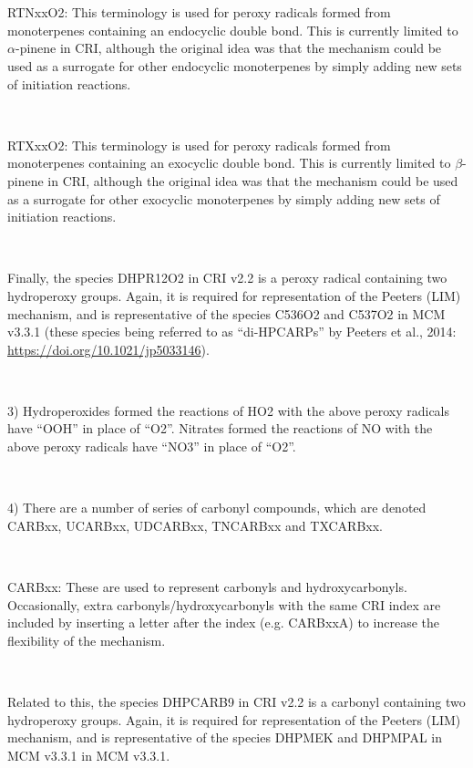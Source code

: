 {{\\}\\ \parbox{\textwidth}{
RTNxxO2: This terminology is used for peroxy radicals formed from monoterpenes containing an endocyclic double bond. This is currently limited to $\alpha$-pinene in CRI, although the original idea was that the mechanism could be used as a surrogate for other endocyclic monoterpenes by simply adding new sets of initiation reactions.
\\}\\ \parbox{\textwidth}{
RTXxxO2: This terminology is used for peroxy radicals formed from monoterpenes containing an exocyclic double bond. This is currently limited to $\beta$-pinene in CRI, although the original idea was that the mechanism could be used as a surrogate for other exocyclic monoterpenes by simply adding new sets of initiation reactions.
\\}\\ \parbox{\textwidth}{
Finally, the species DHPR12O2 in CRI v2.2 is a peroxy radical containing two hydroperoxy groups. Again, it is required for representation of the Peeters (LIM) mechanism, and is representative of the species C536O2 and C537O2 in MCM v3.3.1 (these species being referred to as “di-HPCARPs” by Peeters et al., 2014: \url{https://doi.org/10.1021/jp5033146}).
\\}\\ \parbox{\textwidth}{
3) Hydroperoxides formed the reactions of HO2 with the above peroxy radicals have “OOH” in place of “O2”. Nitrates formed the reactions of NO with the above peroxy radicals have “NO3” in place of “O2”.
\\}\\ \parbox{\textwidth}{
4) There are a number of series of carbonyl compounds, which are denoted CARBxx, UCARBxx, UDCARBxx, TNCARBxx and TXCARBxx.
\\}\\ \parbox{\textwidth}{
CARBxx: These are used to represent carbonyls and hydroxycarbonyls. Occasionally, extra carbonyls/hydroxycarbonyls with the same CRI index are included by inserting a letter after the index (e.g. CARBxxA) to increase the flexibility of the mechanism.
\\}\\ \parbox{\textwidth}{
Related to this, the species DHPCARB9 in CRI v2.2 is a carbonyl containing two hydroperoxy groups. Again, it is required for representation of the Peeters (LIM) mechanism, and is representative of the species DHPMEK and DHPMPAL in MCM v3.3.1  in MCM v3.3.1.
}}
